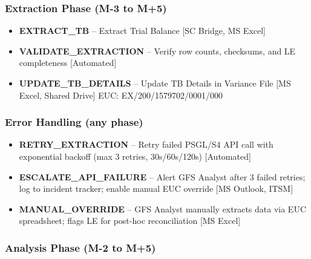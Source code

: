 \documentclass[11pt,a4paper]{article}
\begin{document}
\subsubsection{Extraction Phase (M-3 to M+5)}

\begin{itemize}[noitemsep]
    \item \textbf{EXTRACT\_TB} -- Extract Trial Balance [SC Bridge, MS Excel]
    \item \textbf{VALIDATE\_EXTRACTION} -- Verify row counts, checksums, and LE completeness [Automated]
    \item \textbf{UPDATE\_TB\_DETAILS} -- Update TB Details in Variance File [MS Excel, Shared Drive] EUC: EX/200/1579702/0001/000
\end{itemize}

\subsubsection{Error Handling (any phase)}

\begin{itemize}[noitemsep]
    \item \textbf{RETRY\_EXTRACTION} -- Retry failed PSGL/S4 API call with exponential backoff (max 3 retries, 30s/60s/120s) [Automated]
    \item \textbf{ESCALATE\_API\_FAILURE} -- Alert GFS Analyst after 3 failed retries; log to incident tracker; enable manual EUC override [MS Outlook, ITSM]
    \item \textbf{MANUAL\_OVERRIDE} -- GFS Analyst manually extracts data via EUC spreadsheet; flags LE for post-hoc reconciliation [MS Excel]
\end{itemize}

\subsubsection{Analysis Phase (M-2 to M+5)}
\end{document}
